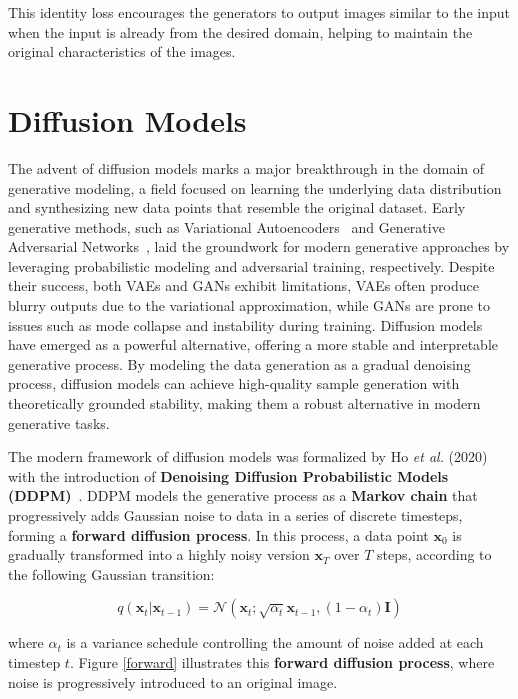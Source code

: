 \documentclass[12pt,DIV14,BCOR12mm,a4paper,footinclude=false,headinclude,parskip=half-,twoside,openright,cleardoublepage=empty,toc=index,bibliography=totoc,listof=totoc]{scrreprt}
\numberwithin{equation}{chapter}
\begin{document}
This identity loss encourages the generators to output images similar to the input when the input is already from the desired domain, helping to maintain the original characteristics of the images.
\section{Diffusion Models}
\label{sec:diffusion_model_theory}
The advent of diffusion models marks a major breakthrough in the domain of generative modeling, a field focused on learning the underlying data distribution and synthesizing new data points that resemble the original dataset. Early generative methods, such as Variational Autoencoders~\cite{VAE} and Generative Adversarial Networks~\cite{goodfellow2014generative}, laid the groundwork for modern generative approaches by leveraging probabilistic modeling and adversarial training, respectively. Despite their success, both VAEs and GANs exhibit limitations, VAEs often produce blurry outputs due to the variational approximation, while GANs are prone to issues such as mode collapse and instability during training. Diffusion models\cite{diffusion1,diffusion2} have emerged as a powerful alternative, offering a more stable and interpretable generative process. By modeling the data generation as a gradual denoising process, diffusion models can achieve high-quality sample generation with theoretically grounded stability, making them a robust alternative in modern generative tasks.

The modern framework of diffusion models was formalized by Ho \textit{et al.} (2020) with the introduction of \textbf{Denoising Diffusion Probabilistic Models (DDPM)}~\cite{diffusion2}. DDPM models the generative process as a \textbf{Markov chain} that progressively adds Gaussian noise to data in a series of discrete timesteps, forming a \textbf{forward diffusion process}. In this process, a data point \(\mathbf{x}_0\) is gradually transformed into a highly noisy version \(\mathbf{x}_T\) over \(T\) steps, according to the following Gaussian transition:

\begin{equation}
q(\mathbf{x}_t | \mathbf{x}_{t-1}) = \mathcal{N}(\mathbf{x}_t; \sqrt{\alpha_t} \mathbf{x}_{t-1}, (1 - \alpha_t)\mathbf{I})
\end{equation}

where \(\alpha_t\) is a variance schedule controlling the amount of noise added at each timestep \(t\). Figure \ref{forward} illustrates this \textbf{forward diffusion process}, where noise is progressively introduced to an original image.
\end{document}
